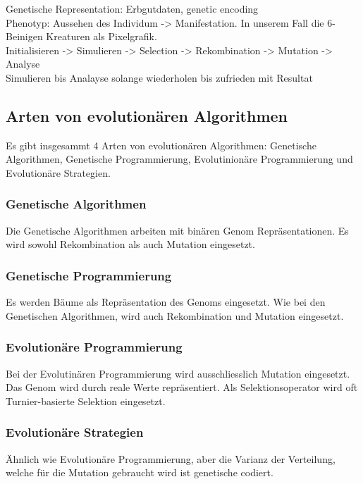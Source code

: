 
    Genetische Representation: Erbgutdaten, genetic encoding \\
    Phenotyp: Aussehen des Individum -> Manifestation. In unserem Fall die 6-Beinigen Kreaturen als Pixelgrafik. \\
    Initialisieren -> Simulieren -> Selection -> Rekombination -> Mutation -> Analyse \\
    Simulieren bis Analayse solange wiederholen bis zufrieden mit Resultat


  \subsection{Arten von evolutionären Algorithmen}
  \label{sub:artenEvAlgos}
    Es gibt insgesammt 4 Arten von evolutionären Algorithmen:
    Genetische Algorithmen, Genetische Programmierung, Evolutinionäre Programmierung
    und Evolutionäre Strategien.

    \subsubsection{Genetische Algorithmen}
    \label{item:genAlgo}
      Die Genetische Algorithmen arbeiten mit binären Genom Repräsentationen.
      Es wird sowohl Rekombination als auch Mutation eingesetzt.

    \subsubsection{Genetische Programmierung}
    \label{item:genProg}
      Es werden Bäume als Repräsentation des Genoms eingesetzt. Wie bei den Genetischen Algorithmen,
      wird auch Rekombination und Mutation eingesetzt.

    \subsubsection{Evolutionäre Programmierung}
    \label{item:evProg}
      Bei der Evolutinären Programmierung wird ausschliesslich Mutation eingesetzt.
      Das Genom wird durch reale Werte repräsentiert. Als Selektionsoperator wird
      oft Turnier-basierte Selektion eingesetzt.

    \subsubsection{Evolutionäre Strategien}
    \label{item:evStrat}
        Ähnlich wie Evolutionäre Programmierung, aber die Varianz der Verteilung,
        welche für die Mutation gebraucht wird ist genetische codiert.
